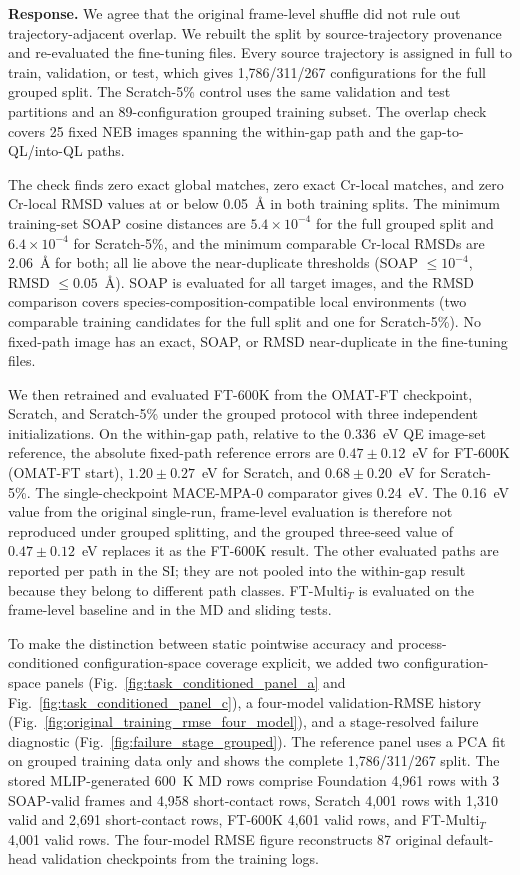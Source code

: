 \documentclass[11pt,a4paper]{article}
\begin{document}
\noindent\textbf{Response.}
We agree that the original frame-level shuffle did not rule out trajectory-adjacent overlap. We rebuilt the split by source-trajectory provenance and re-evaluated the fine-tuning files. Every source trajectory is assigned in full to train, validation, or test, which gives 1,786/311/267 configurations for the full grouped split. The Scratch-5\% control uses the same validation and test partitions and an 89-configuration grouped training subset. The overlap check covers 25 fixed NEB images spanning the within-gap path and the gap-to-QL/into-QL paths.

The check finds zero exact global matches, zero exact Cr-local matches, and zero Cr-local RMSD values at or below 0.05~\AA{} in both training splits. The minimum training-set SOAP cosine distances are $5.4\times10^{-4}$ for the full grouped split and $6.4\times10^{-4}$ for Scratch-5\%, and the minimum comparable Cr-local RMSDs are 2.06~\AA{} for both; all lie above the near-duplicate thresholds (SOAP $\le10^{-4}$, RMSD $\le0.05$~\AA{}). SOAP is evaluated for all target images, and the RMSD comparison covers species-composition-compatible local environments (two comparable training candidates for the full split and one for Scratch-5\%). No fixed-path image has an exact, SOAP, or RMSD near-duplicate in the fine-tuning files.

We then retrained and evaluated FT-600K from the OMAT-FT checkpoint, Scratch, and Scratch-5\% under the grouped protocol with three independent initializations. On the within-gap path, relative to the 0.336~eV QE image-set reference, the absolute fixed-path reference errors are $0.47\pm0.12$~eV for FT-600K (OMAT-FT start), $1.20\pm0.27$~eV for Scratch, and $0.68\pm0.20$~eV for Scratch-5\%. The single-checkpoint MACE-MPA-0 comparator gives 0.24~eV. The 0.16~eV value from the original single-run, frame-level evaluation is therefore not reproduced under grouped splitting, and the grouped three-seed value of $0.47\pm0.12$~eV replaces it as the FT-600K result. The other evaluated paths are reported per path in the SI; they are not pooled into the within-gap result because they belong to different path classes. FT-Multi$_T$ is evaluated on the frame-level baseline and in the MD and sliding tests.

To make the distinction between static pointwise accuracy and process-conditioned configuration-space coverage explicit, we added two configuration-space panels (Fig.~\ref{fig:task_conditioned_panel_a} and Fig.~\ref{fig:task_conditioned_panel_c}), a four-model validation-RMSE history (Fig.~\ref{fig:original_training_rmse_four_model}), and a stage-resolved failure diagnostic (Fig.~\ref{fig:failure_stage_grouped}). The reference panel uses a PCA fit on grouped training data only and shows the complete 1,786/311/267 split. The stored MLIP-generated 600~K MD rows comprise Foundation 4,961 rows with 3 SOAP-valid frames and 4,958 short-contact rows, Scratch 4,001 rows with 1,310 valid and 2,691 short-contact rows, FT-600K 4,601 valid rows, and FT-Multi$_T$ 4,001 valid rows. The four-model RMSE figure reconstructs 87 original default-head validation checkpoints from the training logs.
\end{document}
